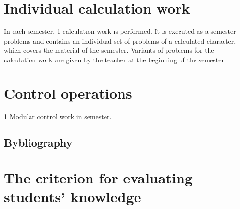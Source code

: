 \documentclass{rnp}
\begin{document}
%
\section{Individual calculation work} 
%

In each semester, 1 calculation work is performed. It is executed as a semester problems and contains an individual set of problems of a calculated character, which covers the material of the semester. Variants of problems for the calculation work are given by the teacher at the beginning of the semester.

%
\section{Control operations}
%

1 Modular control work in semester.



\begin{refsection}
	\section{Bybliography}
	\nocite{
	IrodovMechanics,
	IrodovProblems, 
	Holyday, 
	Crowell1, 
	BerkeleyMechanics,
	BerkeleyWaves,
	FLF1}
	\printbibliography[category=Main, title={Main}, heading=subbibliography]
	\printbibliography[category=Additional, title={Additional}, heading=subbibliography]
\end{refsection}


%
\section{The criterion for evaluating students' knowledge}
%
\end{document}
